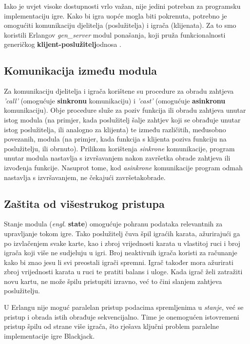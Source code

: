 \documentclass[conference]{IEEEtran}
\begin{document}
Iako je uvjet visoke dostupnosti vrlo važan, nije jedini potreban za programsku implementaciju igre. Kako bi igra uopće mogla biti pokrenuta, potrebno je omogućiti komunikaciju djelitelja (poslužitelja) i igrača (klijenata). Za to smo koristili Erlangov \textit{gen\_server} modul ponašanja, koji pruža funkcionalnosti generičkog \textbf{klijent-poslužitelj}\break odnosa \cite{genserver}.


\subsection{Komunikacija između modula}

Za komunikaciju djelitelja i igrača korištene su procedure za obradu zahtjeva \textit{'call'} (omogućuje \textbf{sinkronu} komunikaciju) i \textit{'cast'} (omogućuje \textbf{asinkronu} komunikaciju). Obje procedure služe za poziv funkcija ili obradu zahtjeva unutar istog modula (na primjer, kada poslužitelj šalje zahtjev koji se obrađuje unutar istog poslužitelja, ili analogno za klijenta) te između različitih, međusobno povezanih, modula (na primjer, kada funkcija s klijenta poziva funkciju na poslužitelju, ili obrnuto). Prilikom korištenja \textit{sinkrone} komunikacije, program unutar modula nastavlja s izvršavanjem nakon završetka obrade zahtjeva ili izvođenja funkcije. Nasuprot tome, kod \textit{asinkrone} komunikacije program odmah nastavlja s izvršavanjem, ne čekajući završetak\break obrade.

\subsection{Zaštita od višestrukog pristupa}

Stanje modula (\textit{engl}. \textbf{state}) omogućuje pohranu podataka relevantnih za upravljanje tokom igre. Tako poslužitelj čuva špil igraćih karata, ažurirajući ga po izvlačenjem svake karte, kao i zbroj vrijednosti karata u vlastitoj ruci i broj igrača koji više ne sudjeluju u igri. Broj neaktivnih igrača koristi za računanje kako bi znao jesu li svi preostali igrači spremni. Igrač također mora ažurirati zbroj vrijednosti karata u ruci te pratiti balans i uloge. Kada igrač želi zatražiti novu kartu, ne može špilu pristupiti izravno, već to čini slanjem zahtjeva poslužitelju.

U Erlangu nije moguć paralelan pristup podacima spremljenima u \textit{stanje}, već se pristup i obrada istih obrađuje sekvencijalno. Time je onemogućen istovremeni pristup špilu od strane više igrača, što rješava ključni problem paralelne implementacije igre Blackjack.
\end{document}
